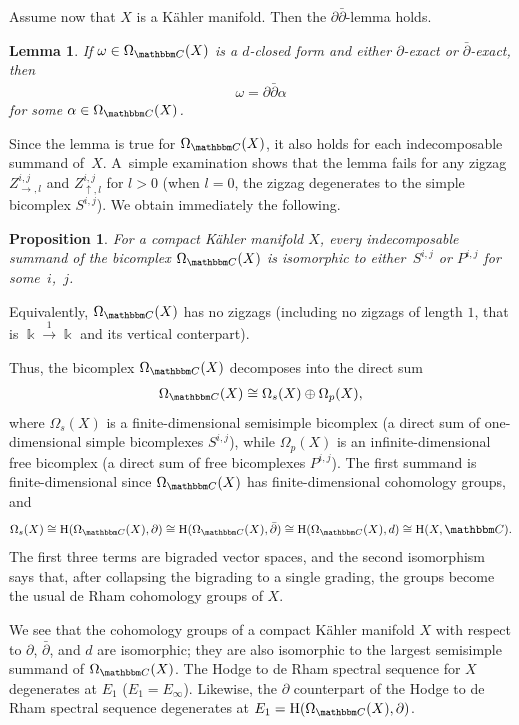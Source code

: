 \documentclass[pdftex]{sigma}
\newtheorem{lem}[thm]{Lemma}
\newtheorem{prop}[thm]{Proposition}
\theoremstyle{definition}
\numberwithin{equation}{section}
\def\C{{\mathbbm C}}
\def\lra{{\longrightarrow}}
\newcommand{\mH}{\mathrm{H}} %
\begin{document}
Assume now that $X$ is a K\"ahler manifold. Then the $\partial\bar{\partial}$-lemma
holds.

\begin{lem}
If $\omega\in \Omega_{\C}(X)$ is a $d$-closed form and
either $\partial$-exact or $\bar{\partial}$-exact, then
\begin{gather*}\omega= \partial\bar{\partial} \alpha\end{gather*}
for some $\alpha\in \Omega_{\C}(X)$.
\end{lem}

Since the lemma is true for $\Omega_{\C}(X)$, it also holds for each
indecomposable summand of~$X$. A~simple examination shows that
the lemma fails for any zigzag $Z^{i,j}_{\rightarrow,l}$ and
$Z^{i,j}_{\uparrow,l}$ for $l>0$ (when $l=0$, the zigzag degenerates
to the simple bicomplex $S^{i,j}$). We obtain immediately the following.

\begin{prop} For a compact K\"ahler manifold $X$, every indecomposable summand of the bicomplex $\Omega_{\C}(X)$ is isomorphic to either~$S^{i,j}$ or $P^{i,j}$ for some~$i$,~$j$.
\end{prop}

Equivalently, $\Omega_{\C}(X)$ has no zigzags (including no zigzags of length $1$, that is $\Bbbk \stackrel{1}{\lra} \Bbbk$ and its vertical conterpart).

Thus, the bicomplex $\Omega_{\C}(X)$ decomposes into the direct sum
\begin{gather*}\Omega_{\C}(X)\cong \Omega_s(X) \oplus \Omega_p(X),\end{gather*}
where $\Omega_s(X)$ is a finite-dimensional semisimple bicomplex (a
direct sum of one-dimensional simple bicomplexes $S^{i,j}$), while
$\Omega_p(X)$ is an infinite-dimensional free bicomplex (a direct
sum of free bicomplexes $P^{i,j}$). The first summand is finite-dimensional since $\Omega_{\C}(X)$ has finite-dimensional cohomology groups, and \begin{gather*}\Omega_s(X)\cong \mH(\Omega_{\C}(X), \partial) \cong
\mH(\Omega_{\C}(X),\bar{\partial}) \cong \mH(\Omega_{\C}(X), d) \cong \mH(X,\C).\end{gather*}
The first three terms are bigraded vector spaces, and the second isomorphism
says that, after collapsing the bigrading to a single grading, the groups become
the usual de Rham cohomology groups of $X$.

We see that the cohomology groups of a compact K\"ahler manifold $X$ with respect to $\partial$, $\bar{\partial}$,
and $d$ are isomorphic; they are also isomorphic to the largest semisimple summand
of $\Omega_{\C}(X)$. The Hodge to de Rham spectral sequence for $X$
degenerates at $E_1$ ($E_1=E_{\infty}$). Likewise, the $\partial$ counterpart of the Hodge to de Rham spectral sequence degenerates at
 $E_1=\mH(\Omega_{\C}(X), \partial)$.
\end{document}
